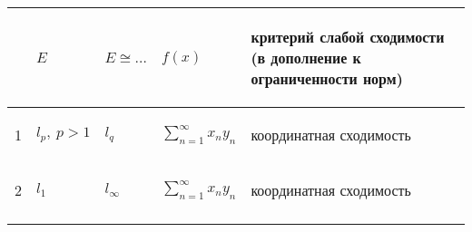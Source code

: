 \begin{table}[!h]
        \centering
        
\begin{tabular}{|p{}|p{}|p{}|p{}|p{}|}
\hline 
    \begin{center}
\end{center}
    & \begin{center}
$\displaystyle E$
\end{center}
    & \begin{center}
$\displaystyle E\cong \dotsc $
\end{center}
    & \begin{center}
$\displaystyle f( x)$
\end{center}
    & \begin{center}
критерий слабой сходимости (в дополнение к ограниченности норм)
\end{center}
    \\
\hline 
    \begin{center}
1
\end{center}
    & \begin{center}
$\displaystyle l_{p} ,\ p >1$
\end{center}
    & \begin{center}
$\displaystyle l_{q}$
\end{center}
    & \begin{center}
$\displaystyle \sum _{n=1}^{\infty } x_{n} y_{n}$
\end{center}
    & \begin{center}
координатная сходимость
\end{center}
    \\
\hline 
    \begin{center}
2
\end{center}
    & \begin{center}
$\displaystyle l_{1}$
\end{center}
    & \begin{center}
$\displaystyle l_{\infty }$
\end{center}
    & \begin{center}
$\displaystyle \sum _{n=1}^{\infty } x_{n} y_{n}$
\end{center}
    & \begin{center}
координатная сходимость
\end{center}
    \\
\hline 
    \begin{center}

\end{center}
\end{tabular}
\end{table}
